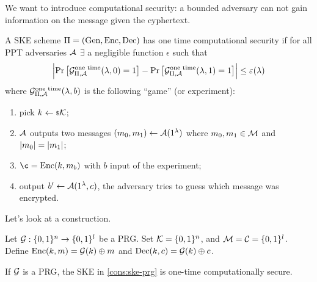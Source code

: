 We want to introduce computational security: a bounded adversary can not gain information on the message given the cyphertext.
\begin{definition}
	A \ac{SKE} scheme $\Pi = \left( \mathrm{Gen} , \allowbreak \mathrm{Enc} , \allowbreak \mathrm{Dec} \right)$ has one time computational security if for all \ac{PPT} adversaries $\mathcal{A}$ $\exists$ a negligible function $\epsilon$ such that
	\begin{equation*}
		\left|{
			\mathop{\mathrm{Pr}}\limits_{} \left[ {\mathcal{G}^{\scriptstyle \text{one time}}_{\Pi, \mathcal{A}}(\lambda, 0) = 1} \right]
			-
			\mathop{\mathrm{Pr}}\limits_{} \left[ {\mathcal{G}^{\scriptstyle \text{one time}}_{\Pi, \mathcal{A}}(\lambda, 1) = 1} \right]
		}\right|
		\le \varepsilon(\lambda)
	\end{equation*}
	where $\mathcal{G}^{\scriptstyle \text{one time}}_{\Pi, \mathcal{A}}(\lambda, b)$ is the following ``game'' (or experiment):
	\begin{enumerate}
		\item pick $k \leftarrow {\scriptstyle \$} {\mathcal{K}}$;
		\item $\mathcal{A}$ outputs two messages $(m_0, m_1) \leftarrow \mathcal{A}(1^{\lambda})$ where $m_0, m_1 \in \mathcal{M}$ and $\left|{m_0}\right| = \left|{m_1}\right|$;
		\item $\c = \SKEEnc(k, m_b)$ with $b$ input of the experiment;
		\item output $b' \leftarrow \mathcal{A}(1^{\lambda}, c)$, \ie the adversary tries to guess which message was encrypted. \qedhere
	\end{enumerate}
\end{definition}

Let's look at a construction.
\begin{construction} \label{cons:ske-prg}
	Let $\mathcal{G} : \{0,1\}^{n} \to \{0,1\}^{l}$ be a \ac{PRG}.
	Set $\mathcal{K} = \{0,1\}^{n}$, and $\mathcal{M} = \mathcal{C} = \{0,1\}^{l}$.
	Define $\mathrm{Enc}(k,m) = \mathcal{G}(k) \oplus m$ and $\mathrm{Dec}(k,c) = \mathcal{G}(k) \oplus c$.
\end{construction}

\begin{theorem} \label{thm:ske-prg}
	If $\mathcal{G}$ is a \ac{PRG}, the \ac{SKE} in \cref{cons:ske-prg} is one-time computationally secure.
\end{theorem}

